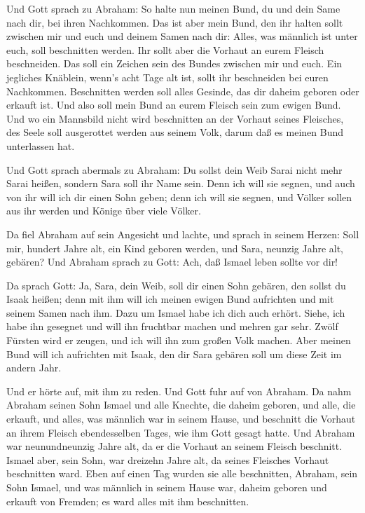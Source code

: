  Und Gott sprach zu Abraham: So halte nun meinen Bund, du
und dein Same nach dir, bei ihren Nachkommen.  Das ist aber
mein Bund, den ihr halten sollt zwischen mir und euch und deinem Samen
nach dir: Alles, was männlich ist unter euch, soll beschnitten werden.
 Ihr sollt aber die Vorhaut an eurem Fleisch beschneiden.
Das soll ein Zeichen sein des Bundes zwischen mir und euch.
 Ein jegliches Knäblein, wenn's acht Tage alt ist, sollt
ihr beschneiden bei euren Nachkommen.  Beschnitten werden
soll alles Gesinde, das dir daheim geboren oder erkauft ist. Und also
soll mein Bund an eurem Fleisch sein zum ewigen Bund.  Und
wo ein Mannsbild nicht wird beschnitten an der Vorhaut seines Fleisches,
des Seele soll ausgerottet werden aus seinem Volk, darum daß es meinen
Bund unterlassen hat.

 Und Gott sprach abermals zu Abraham: Du sollst dein Weib
Sarai nicht mehr Sarai heißen, sondern Sara soll ihr Name sein.
 Denn ich will sie segnen, und auch von ihr will ich dir
einen Sohn geben; denn ich will sie segnen, und Völker sollen aus ihr
werden und Könige über viele Völker.

 Da fiel Abraham auf sein Angesicht und lachte, und sprach
in seinem Herzen: Soll mir, hundert Jahre alt, ein Kind geboren werden,
und Sara, neunzig Jahre alt, gebären?  Und Abraham sprach
zu Gott: Ach, daß Ismael leben sollte vor dir!

 Da sprach Gott: Ja, Sara, dein Weib, soll dir einen Sohn
gebären, den sollst du Isaak heißen; denn mit ihm will ich meinen ewigen
Bund aufrichten und mit seinem Samen nach ihm.  Dazu um
Ismael habe ich dich auch erhört. Siehe, ich habe ihn gesegnet und will
ihn fruchtbar machen und mehren gar sehr. Zwölf Fürsten wird er zeugen,
und ich will ihn zum großen Volk machen.  Aber meinen Bund
will ich aufrichten mit Isaak, den dir Sara gebären soll um diese Zeit
im andern Jahr.

 Und er hörte auf, mit ihm zu reden. Und Gott fuhr auf von
Abraham.  Da nahm Abraham seinen Sohn Ismael und alle
Knechte, die daheim geboren, und alle, die erkauft, und alles, was
männlich war in seinem Hause, und beschnitt die Vorhaut an ihrem Fleisch
ebendesselben Tages, wie ihm Gott gesagt hatte.  Und
Abraham war neunundneunzig Jahre alt, da er die Vorhaut an seinem
Fleisch beschnitt.  Ismael aber, sein Sohn, war dreizehn
Jahre alt, da seines Fleisches Vorhaut beschnitten ward. 
Eben auf einen Tag wurden sie alle beschnitten, Abraham, sein Sohn
Ismael,  und was männlich in seinem Hause war, daheim
geboren und erkauft von Fremden; es ward alles mit ihm beschnitten.

